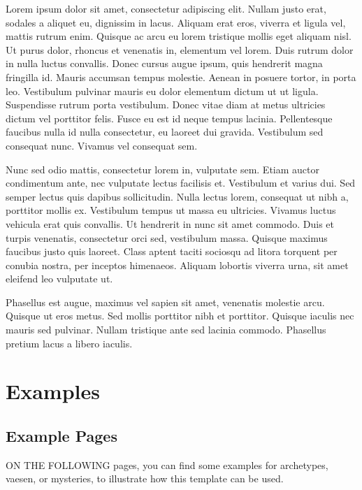 \documentclass[english]{vaesen-supplement}
\begin{document}
Lorem ipsum dolor sit amet, consectetur adipiscing elit. Nullam justo erat, sodales a aliquet eu, dignissim in lacus. Aliquam erat eros, viverra et ligula vel, mattis rutrum enim. Quisque ac arcu eu lorem tristique mollis eget aliquam nisl. Ut purus dolor, rhoncus et venenatis in, elementum vel lorem. Duis rutrum dolor in nulla luctus convallis. Donec cursus augue ipsum, quis hendrerit magna fringilla id. Mauris accumsan tempus molestie. Aenean in posuere tortor, in porta leo. Vestibulum pulvinar mauris eu dolor elementum dictum ut ut ligula. Suspendisse rutrum porta vestibulum. Donec vitae diam at metus ultricies dictum vel porttitor felis. Fusce eu est id neque tempus lacinia. Pellentesque faucibus nulla id nulla consectetur, eu laoreet dui gravida. Vestibulum sed consequat nunc. Vivamus vel consequat sem.

Nunc sed odio mattis, consectetur lorem in, vulputate sem. Etiam auctor condimentum ante, nec vulputate lectus facilisis et. Vestibulum et varius dui. Sed semper lectus quis dapibus sollicitudin. Nulla lectus lorem, consequat ut nibh a, porttitor mollis ex. Vestibulum tempus ut massa eu ultricies. Vivamus luctus vehicula erat quis convallis. Ut hendrerit in nunc sit amet commodo. Duis et turpis venenatis, consectetur orci sed, vestibulum massa. Quisque maximus faucibus justo quis laoreet. Class aptent taciti sociosqu ad litora torquent per conubia nostra, per inceptos himenaeos. Aliquam lobortis viverra urna, sit amet eleifend leo vulputate ut.

Phasellus est augue, maximus vel sapien sit amet, venenatis molestie arcu. Quisque ut eros metus. Sed mollis porttitor nibh et porttitor. Quisque iaculis nec mauris sed pulvinar. Nullam tristique ante sed lacinia commodo. Phasellus pretium lacus a libero iaculis.

\part{Examples}

\chapter{Example Pages}

\noindent ON THE FOLLOWING pages, you can find some examples for archetypes, vaesen, or mysteries, to illustrate how this template can be used.
\end{document}
